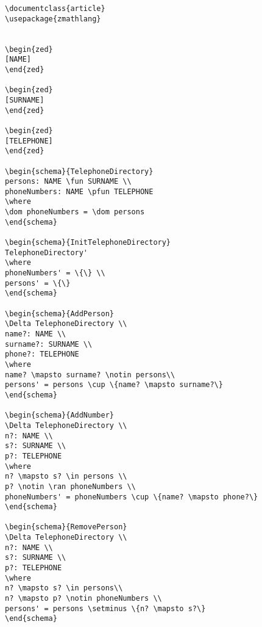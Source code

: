 \begin{verbatim}
\documentclass{article}
\usepackage{zmathlang}


\begin{zed}
[NAME] 
\end{zed}

\begin{zed}
[SURNAME]
\end{zed}

\begin{zed}
[TELEPHONE]
\end{zed}

\begin{schema}{TelephoneDirectory}
persons: NAME \fun SURNAME \\ 
phoneNumbers: NAME \pfun TELEPHONE
\where 
\dom phoneNumbers = \dom persons
\end{schema}

\begin{schema}{InitTelephoneDirectory} 
TelephoneDirectory'
\where 
phoneNumbers' = \{\} \\
persons' = \{\}
\end{schema}

\begin{schema}{AddPerson}
\Delta TelephoneDirectory \\
name?: NAME \\
surname?: SURNAME \\
phone?: TELEPHONE
\where
name? \mapsto surname? \notin persons\\
persons' = persons \cup \{name? \mapsto surname?\}
\end{schema}

\begin{schema}{AddNumber}
\Delta TelephoneDirectory \\
n?: NAME \\
s?: SURNAME \\
p?: TELEPHONE
\where
n? \mapsto s? \in persons \\
p? \notin \ran phoneNumbers \\
phoneNumbers' = phoneNumbers \cup \{name? \mapsto phone?\}
\end{schema}

\begin{schema}{RemovePerson}
\Delta TelephoneDirectory \\
n?: NAME \\
s?: SURNAME \\
p?: TELEPHONE
\where
n? \mapsto s? \in persons\\
n? \mapsto p? \notin phoneNumbers \\
persons' = persons \setminus \{n? \mapsto s?\}
\end{schema}


\end{verbatim}
